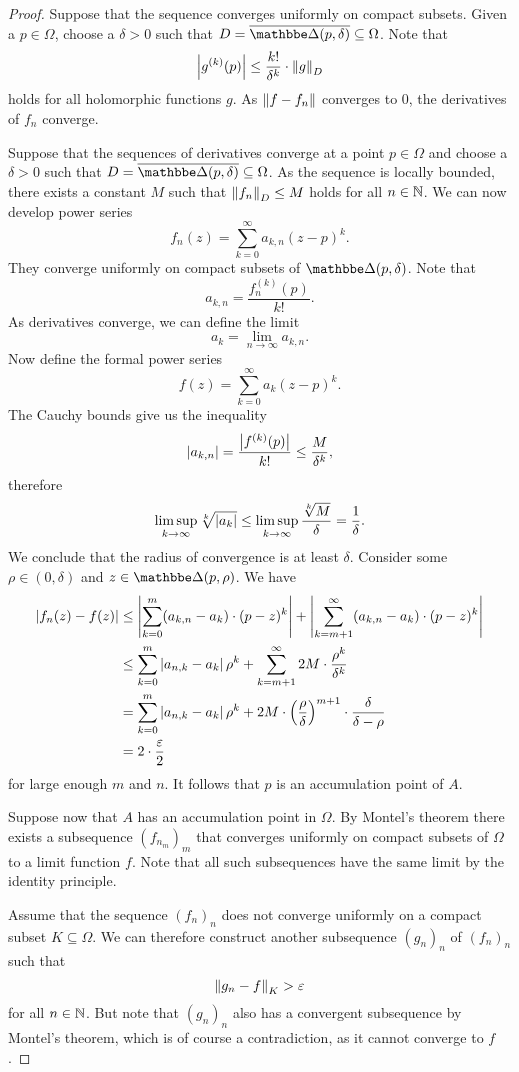 \begin{proof}
Suppose that the sequence converges uniformly on compact subsets.
Given a $p \in \Omega$, choose a $\delta > 0$ such that
$D = \oline{\dsk(p, \delta)} \subseteq \Omega$. Note that
\[
\left\lvert g^{(k)}(p)\right\rvert \leq \frac{k!}{\delta^k} \cdot \left\lVert g\right\rVert_D
\]
holds for all holomorphic functions $g$. As
$\left\lVert f - f_n\right\rVert$ converges to $0$, the derivatives of $f_n$
converge.

Suppose that the sequences of derivatives converge at a point
$p \in \Omega$ and choose a $\delta > 0$ such that
$D = \oline{\dsk(p, \delta)} \subseteq \Omega$. As the sequence is
locally bounded, there exists a constant $M$ such that
$\left\lVert f_n\right\rVert_D \leq M$ holds for all $n \in \mathbb{N}$. We can now develop
power series
\[
f_n(z) = \sum_{k=0}^\infty a_{k,n} (z-p)^k.
\]
They converge uniformly on compact subsets of $\dsk(p, \delta)$.
Note that
\[
a_{k,n} = \frac{f_n^{(k)}(p)}{k!}.
\]
As derivatives converge, we can define the limit
\[
a_k = \lim_{n \to \infty} a_{k,n}.
\]
Now define the formal power series
\[
f(z) = \sum_{k=0}^\infty a_k (z-p)^k.
\]
The Cauchy bounds give us the inequality
\[
\left\lvert a_{k,n}\right\rvert =
\frac{\left\lvert f^{(k)}(p)\right\rvert}{k!} \leq \frac{M}{\delta^k},
\]
therefore
\[
\limsup_{k \to \infty} \sqrt[k]{\left\lvert a_k\right\rvert} \leq
\limsup_{k \to \infty} \frac{\sqrt[k]{M}}{\delta} =
\frac{1}{\delta}.
\]
We conclude that the radius of convergence is at least $\delta$.
Consider some $\rho \in (0, \delta)$ and
$z \in \dsk(p, \rho)$. We have
\begin{align*}
\left\lvert f_n(z) - f(z)\right\rvert &\leq
\left\lvert \sum_{k=0}^m (a_{k,n} - a_k) \cdot (p-z)^k\right\rvert +
\left\lvert \sum_{k=m+1}^\infty (a_{k,n} - a_k) \cdot (p-z)^k\right\rvert
\\
&\leq
\sum_{k=0}^m \left\lvert a_{n,k} - a_k\right\rvert \rho^k +
\sum_{k=m+1}^\infty 2M \cdot \frac{\rho^k}{\delta^k}
\\
&=
\sum_{k=0}^m \left\lvert a_{n,k} - a_k\right\rvert \rho^k +
2M \cdot \left(\frac{\rho}{\delta}\right)^{m+1} \cdot
\frac{\delta}{\delta - \rho}
\\
&=
2 \cdot \frac{\varepsilon}{2}
\end{align*}
for large enough $m$ and $n$. It follows that $p$ is an
accumulation point of $A$.

Suppose now that $A$ has an accumulation point in $\Omega$. By
Montel's theorem there exists a subsequence $(f_{n_m})_m$ that
converges uniformly on compact subsets of $\Omega$ to a limit
function $f$. Note that all such subsequences have the same limit
by the identity principle.

Assume that the sequence $(f_n)_n$ does not converge uniformly on
a compact subset $K \subseteq \Omega$. We can therefore construct
another subsequence $(g_n)_n$ of $(f_n)_n$ such that
\[
\left\lVert g_n - f\right\rVert_K > \varepsilon
\]
for all $n \in \mathbb{N}$. But note that $(g_n)_n$ also has a convergent
subsequence by Montel's theorem, which is of course a
contradiction, as it cannot converge to $f$.
\end{proof}

